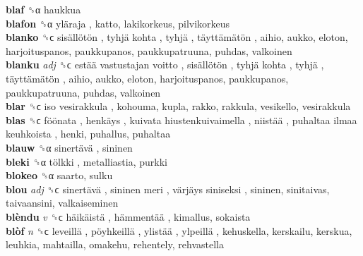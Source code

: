 \textbf{blaf} ␝α  haukkua  \\
\textbf{blafon} ␝α   yläraja , katto, lakikorkeus, pilvikorkeus  \\
\textbf{blanko} ␝ϲ   sisällötön ,  tyhjä kohta ,  tyhjä ,  täyttämätön , aihio, aukko, eloton, harjoituspanos, paukkupanos, paukkupatruuna, puhdas, valkoinen  \\
\textbf{blanku} \emph{adj}  ␝ϲ   estää vastustajan voitto ,  sisällötön ,  tyhjä kohta ,  tyhjä ,  täyttämätön , aihio, aukko, eloton, harjoituspanos, paukkupanos, paukkupatruuna, puhdas, valkoinen  \\
\textbf{blar} ␝ϲ   iso vesirakkula , kohouma, kupla, rakko, rakkula, vesikello, vesirakkula  \\
\textbf{blas} ␝ϲ   föönata ,  henkäys ,  kuivata hiustenkuivaimella ,  niistää ,  puhaltaa ilmaa keuhkoista , henki, puhallus, puhaltaa  \\
\textbf{blauw} ␝α   sinertävä , sininen  \\
\textbf{bleki} ␝α   tölkki , metalliastia, purkki  \\
\textbf{blokeo} ␝α  saarto, sulku  \\
\textbf{blou} \emph{adj}  ␝ϲ   sinertävä ,  sininen meri ,  värjäys siniseksi , sininen, sinitaivas, taivaansini, valkaiseminen  \\
\textbf{blèndu} \emph{v}  ␝ϲ   häikäistä ,  hämmentää , kimallus, sokaista  \\
\textbf{blòf} \emph{n}  ␝ϲ   leveillä ,  pöyhkeillä ,  ylistää ,  ylpeillä , kehuskella, kerskailu, kerskua, leuhkia, mahtailla, omakehu, rehentely, rehvastella  \\
